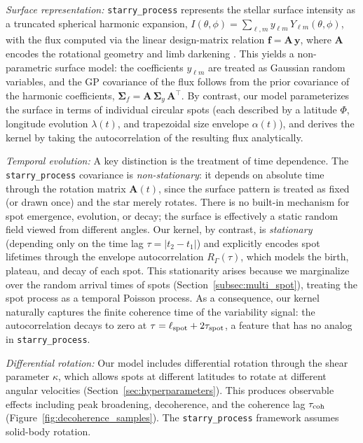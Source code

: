 \documentclass[preprint]{aastex702}
\newcommand{\code}[1]{{\texttt{#1}}}
\begin{document}
\textit{Surface representation: }
\code{starry\_process} represents the stellar surface intensity as a truncated spherical harmonic expansion, $I(\theta,\phi) = \sum_{\ell,m} y_{\ell m}\,Y_{\ell m}(\theta,\phi)$, with the flux computed via the linear design-matrix relation $\mathbf{f} = \mathbf{A}\,\mathbf{y}$, where $\mathbf{A}$ encodes the rotational geometry and limb darkening \citep{luger_starry_2019}. This yields a non-parametric surface model: the coefficients $y_{\ell m}$ are treated as Gaussian random variables, and the GP covariance of the flux follows from the prior covariance of the harmonic coefficients, $\boldsymbol{\Sigma}_f = \mathbf{A}\,\boldsymbol{\Sigma}_y\,\mathbf{A}^\top$. By contrast, our model parameterizes the surface in terms of individual circular spots (each described by a latitude $\Phi$, longitude evolution $\lambda(t)$, and trapezoidal size envelope $\alpha(t)$), and derives the kernel by taking the autocorrelation of the resulting flux analytically.

\textit{Temporal evolution: }
A key distinction is the treatment of time dependence. The \code{starry\_process} covariance is \emph{non-stationary}: it depends on absolute time through the rotation matrix $\mathbf{A}(t)$, since the surface pattern is treated as fixed (or drawn once) and the star merely rotates. There is no built-in mechanism for spot emergence, evolution, or decay; the surface is effectively a static random field viewed from different angles. Our kernel, by contrast, is \emph{stationary} (depending only on the time lag $\tau = |t_2 - t_1|$) and explicitly encodes spot lifetimes through the envelope autocorrelation $R_\Gamma(\tau)$, which models the birth, plateau, and decay of each spot. This stationarity arises because we marginalize over the random arrival times of spots (Section~\ref{subsec:multi_spot}), treating the spot process as a temporal Poisson process. As a consequence, our kernel naturally captures the finite coherence time of the variability signal: the autocorrelation decays to zero at $\tau = \ell_{\rm spot} + 2\tau_{\rm spot}$, a feature that has no analog in \code{starry\_process}.

\textit{Differential rotation: }
Our model includes differential rotation through the shear parameter $\kappa$, which allows spots at different latitudes to rotate at different angular velocities (Section~\ref{sec:hyperparameters}). This produces observable effects including peak broadening, decoherence, and the coherence lag $\tau_{\rm coh}$ (Figure~\ref{fig:decoherence_samples}). The \code{starry\_process} framework assumes solid-body rotation.
\end{document}
